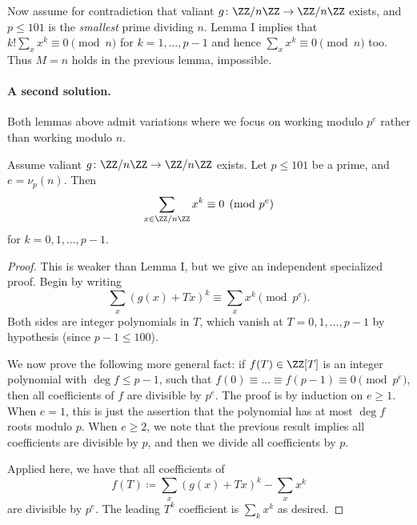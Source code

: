 \documentclass[11pt]{scrartcl}
\begin{document}
Now assume for contradiction that valiant
$g \colon \ZZ/n\ZZ \to \ZZ/n\ZZ$ exists,
and $p \le 101$ is the \emph{smallest} prime dividing $n$.
Lemma I implies that $k! \sum_x x^k \equiv 0 \pmod n$
for $k = 1, \dots, p-1$
and hence $\sum_x x^k \equiv 0 \pmod n$ too.
Thus $M = n$ holds in the previous lemma, impossible.

\paragraph{A second solution.}
Both lemmas above admit variations
where we focus on working modulo $p^e$ rather than working modulo $n$.
\begin{lemma*}
  [Lemma I']
  Assume valiant $g \colon \ZZ/n\ZZ \to \ZZ/n\ZZ$ exists.
  Let $p \le 101$ be a prime, and $e = \nu_p(n)$.
  Then \[ \sum_{x \in \ZZ/n\ZZ} x^k \equiv 0 \pmod{p^e} \]
  for $k = 0, 1, \dots, p-1$.
\end{lemma*}
\begin{proof}
  This is weaker than Lemma I,
  but we give an independent specialized proof.
  Begin by writing
  \[ \sum_x \left( g(x) + Tx \right)^k \equiv \sum_x x^k \pmod{p^e}. \]
  Both sides are integer polynomials in $T$,
  which vanish at $T = 0, 1, \dots, p-1$ by hypothesis
  (since $p-1 \le 100$).

  We now prove the following more general fact:
  if $f(T) \in \ZZ[T]$ is an integer polynomial with $\deg f \le p-1$,
  such that $f(0) \equiv \dots \equiv f(p-1) \equiv 0 \pmod{p^e}$,
  then all coefficients of $f$ are divisible by $p^e$.
  The proof is by induction on $e \ge 1$.
  When $e = 1$, this is just the assertion that
  the polynomial has at most $\deg f$ roots modulo $p$.
  When $e \ge 2$, we note that the previous result
  implies all coefficients are divisible by $p$,
  and then we divide all coefficients by $p$.

  Applied here, we have that all coefficients of
  \[ f(T) \coloneqq \sum_x \left( g(x) + Tx \right)^k - \sum_x x^k \]
  are divisible by $p^e$.
  The leading $T^k$ coefficient is $\sum_k x^k$ as desired.
\end{proof}
\end{document}
